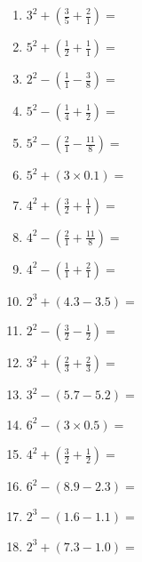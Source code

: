 \documentclass[12pt]{article}
\begin{document}
    \begin{enumerate}
\item \large $ 3^{2} + (\frac{3}{5} + \frac{2}{1}) = $ \vspace{1.4cm}
\item \large $ 5^{2} + (\frac{1}{2} + \frac{1}{1}) = $ \vspace{1.4cm}
\item \large $ 2^{2} - (\frac{1}{1} - \frac{3}{8}) = $ \vspace{1.4cm}
\item \large $ 5^{2} - (\frac{1}{4} + \frac{1}{2}) = $ \vspace{1.4cm}
\item \large $ 5^{2} - (\frac{2}{1} - \frac{11}{8}) = $ \vspace{1.4cm}
\item \large $ 5^{2} + (3 \times 0.1) = $ \vspace{1.4cm}
\item \large $ 4^{2} + (\frac{3}{2} + \frac{1}{1}) = $ \vspace{1.4cm}
\item \large $ 4^{2} - (\frac{2}{1} + \frac{11}{8}) = $ \vspace{1.4cm}
\newpage
\item \large $ 4^{2} - (\frac{1}{1} + \frac{2}{1}) = $ \vspace{1.4cm}
\item \large $ 2^{3} + (4.3 - 3.5) = $ \vspace{1.4cm}
\item \large $ 2^{2} - (\frac{3}{2} - \frac{1}{2}) = $ \vspace{1.4cm}
\item \large $ 3^{2} + (\frac{2}{3} + \frac{2}{3}) = $ \vspace{1.4cm}
\item \large $ 3^{2} - (5.7 - 5.2) = $ \vspace{1.4cm}
\item \large $ 6^{2} - (3 \times 0.5) = $ \vspace{1.4cm}
\item \large $ 4^{2} + (\frac{3}{2} + \frac{1}{2}) = $ \vspace{1.4cm}
\item \large $ 6^{2} - (8.9 - 2.3) = $ \vspace{1.4cm}
\item \large $ 2^{3} - (1.6 - 1.1) = $ \vspace{1.4cm}
\item \large $ 2^{3} + (7.3 - 1.0) = $ \vspace{1.4cm}

\end{enumerate}
\end{document}
